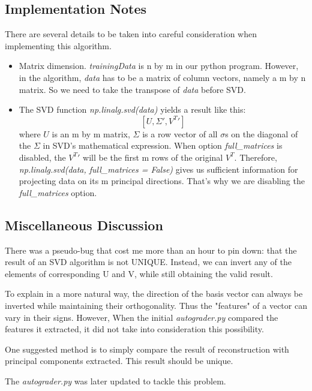 \documentclass{article}
\begin{document}
\subsection{Implementation Notes}
  There are several details to be taken into careful consideration when implementing this algorithm.
  \begin{itemize}
    \item Matrix dimension. \textit{trainingData} is n by m in our python program. However, in the algorithm, \textit{data} has to be a matrix of column vectors, namely a m by n matrix. So we need to take the transpose of \textit{data} before SVD.
    \item The SVD function \textit{np.linalg.svd(data)} yields a result like this: $$[U, \Sigma', V^T{'}]$$ where $U$ is an m by m matrix, $\Sigma$ is a row vector of all $\sigma$s on the diagonal of the $\Sigma$ in SVD's mathematical expression. When option \textit{full\_matrices} is disabled, the $V^T{'}$ will be the first m rows of the original $V^T$. Therefore, \textit{np.linalg.svd(data, full\_matrices = False)} gives us sufficient information for projecting data on its m principal directions. That's why we are disabling the \textit{full\_matrices} option.
  \end{itemize}
\subsection{Miscellaneous Discussion}
  There was a pseudo-bug that cost me more than an hour to pin down: that the result of an SVD algorithm is not UNIQUE. Instead, we can invert any of the elements of corresponding U and V, while still obtaining the valid result.\par
  To explain in a more natural way, the direction of the basis vector can always be inverted while maintaining their orthogonality. Thus the "features" of a vector can vary in their signs. However, When the initial \textit{autograder.py} compared the features it extracted, it did not take into consideration this possibility.\par
  One suggested method is to simply compare the result of reconstruction with principal components extracted. This result should be unique.\par
  The \textit{autograder.py} was later updated to tackle this problem.
\end{document}

